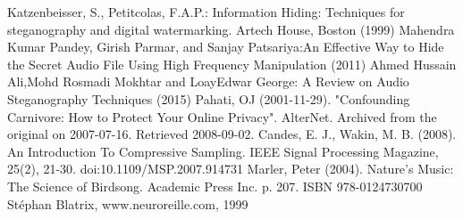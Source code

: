 \documentclass[12pt]{report}
\begin{document}
\begin{thebibliography}{6}
Katzenbeisser, S., Petitcolas, F.A.P.: Information Hiding: Techniques for steganography 
and digital watermarking. Artech House, Boston (1999) 
Mahendra Kumar Pandey, Girish Parmar, and Sanjay Patsariya:An Effective Way to Hide the Secret Audio File Using 
High Frequency Manipulation (2011)
Ahmed Hussain Ali,Mohd Rosmadi Mokhtar and LoayEdwar George: A Review on Audio Steganography Techniques (2015)
Pahati, OJ (2001-11-29). "Confounding Carnivore: How to Protect Your Online Privacy". AlterNet. Archived from the original on 2007-07-16. Retrieved 2008-09-02.
Candes, E. J., Wakin, M. B. (2008). An Introduction To Compressive Sampling. IEEE Signal Processing Magazine, 25(2), 21-30. doi:10.1109/MSP.2007.914731
Marler, Peter (2004). Nature's Music: The Science of Birdsong. Academic Press Inc. p. 207. ISBN 978-0124730700
Stéphan Blatrix, www.neuroreille.com, 1999
\end{thebibliography}
\end{document}
